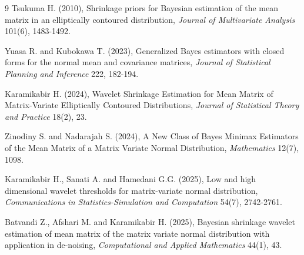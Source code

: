 \documentclass[twoside]{article}
\begin{document}
\begin{thebibliography}{9}
%
Tsukuma H. (2010), Shrinkage priors for Bayesian estimation of the mean matrix in an elliptically contoured distribution, {\it Journal of Multivariate Analysis} 101(6), 1483-1492. %

Yuasa R. and Kubokawa T. (2023), Generalized Bayes estimators with closed forms for the normal mean and covariance matrices, {\it Journal of Statistical Planning and Inference} 222, 182-194. 

Karamikabir H. (2024), Wavelet Shrinkage Estimation for Mean Matrix of Matrix-Variate Elliptically Contoured Distributions, {\it Journal of Statistical Theory and Practice} 18(2), 23. %

Zinodiny S. and Nadarajah S. (2024), A New Class of Bayes Minimax Estimators of the Mean Matrix of a Matrix Variate Normal Distribution, {\it Mathematics} 12(7), 1098. %

Karamikabir H., Sanati A. and Hamedani G.G. (2025), Low and high dimensional wavelet thresholds for matrix-variate normal distribution, {\it Communications in Statistics-Simulation and Computation} 54(7), 2742-2761.

Batvandi Z., Afshari M. and Karamikabir H. (2025), Bayesian shrinkage wavelet estimation of mean matrix of the matrix variate normal distribution with application in de-noising, {\it Computational and Applied Mathematics} 44(1), 43. %



\end{thebibliography}
 
\end{document}
